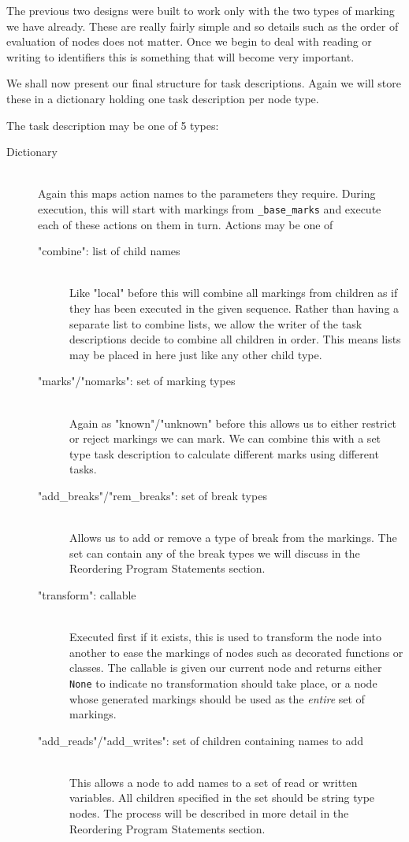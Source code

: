 \documentclass[twoside,a4paper]{report}
\begin{document}
The previous two designs were built to work only with the two types of marking we have already. These are really fairly simple and so details such
as the order of evaluation of nodes does not matter. Once we begin to deal with reading or writing to identifiers this is something that will become
very important.
 
We shall now present our final structure for task descriptions. Again we will store these in a dictionary holding one task description per node type.

The task description may be one of 5 types:

\begin{description}
\item[Dictionary] \hfill \\
Again this maps action names to the parameters they require. During execution, this will start with markings from \texttt{\_base\_marks} and
execute each of these actions on them in turn. Actions may be one of

\begin{description}
  \item["combine": list of child names] \hfill \\
  Like "local" before this will combine all markings from children as if they has been executed in the given sequence. Rather than having a
  separate list to combine lists, we allow the writer of the task descriptions decide to combine all children in order. This means lists may
  be placed in here just like any other child type.
  \item["marks"/"nomarks": set of marking types] \hfill \\
  Again as "known"/"unknown" before this allows us to either restrict or reject markings we can mark. We can combine this with a set type task
  description to calculate different marks using different tasks.
  \item["add\_breaks"/"rem\_breaks": set of break types] \hfill \\
  Allows us to add or remove a type of break from the markings. The set can contain any of the break types we will discuss in the Reordering
  Program Statements section.
  \item["transform": callable] \hfill \\
  Executed first if it exists, this is used to transform the node into another to ease the markings of nodes such as decorated functions or
  classes. The callable is given our current node and returns either \texttt{None} to indicate no transformation should take place, or a
  node whose generated markings should be used as the \textit{entire} set of markings.
  \item["add\_reads"/"add\_writes": set of children containing names to add] \hfill \\
  This allows a node to add names to a set of read or written variables. All children specified in the set should be string type nodes. The process
  will be described in more detail in the Reordering Program Statements section.
\end{description}


\end{description}
\end{document}
